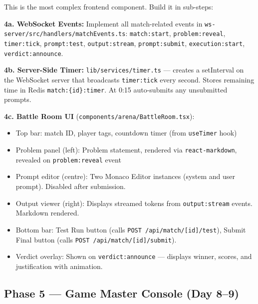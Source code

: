 \documentclass[11pt, a4paper]{article}
\begin{document}
\begin{tcolorbox}[phasebox=warnamber, title={Goal: Complete live 1v1 match room UI}]
This is the most complex frontend component. Build it in sub-steps:

\textbf{4a. WebSocket Events:} Implement all match-related events in \texttt{ws-server/src/handlers/matchEvents.ts}:
\texttt{match:start}, \texttt{problem:reveal}, \texttt{timer:tick}, \texttt{prompt:test}, \texttt{output:stream}, \texttt{prompt:submit}, \texttt{execution:start}, \texttt{verdict:announce}.

\textbf{4b. Server-Side Timer:} \texttt{lib/services/timer.ts} --- creates a setInterval on the WebSocket server that broadcasts \texttt{timer:tick} every second. Stores remaining time in Redis \texttt{match:\{id\}:timer}. At 0:15 auto-submits any unsubmitted prompts.

\textbf{4c. Battle Room UI} (\texttt{components/arena/BattleRoom.tsx}):
\begin{itemize}[leftmargin=1cm, itemsep=2pt]
    \item Top bar: match ID, player tags, countdown timer (from \texttt{useTimer} hook)
    \item Problem panel (left): Problem statement, rendered via \texttt{react-markdown}, revealed on \texttt{problem:reveal} event
    \item Prompt editor (centre): Two Monaco Editor instances (system and user prompt). Disabled after submission.
    \item Output viewer (right): Displays streamed tokens from \texttt{output:stream} events. Markdown rendered.
    \item Bottom bar: Test Run button (calls \texttt{POST /api/match/[id]/test}), Submit Final button (calls \texttt{POST /api/match/[id]/submit}).
    \item Verdict overlay: Shown on \texttt{verdict:announce} --- displays winner, scores, and justification with animation.
\end{itemize}
\end{tcolorbox}

\subsection{Phase 5 --- Game Master Console (Day 8--9)}
\end{document}
